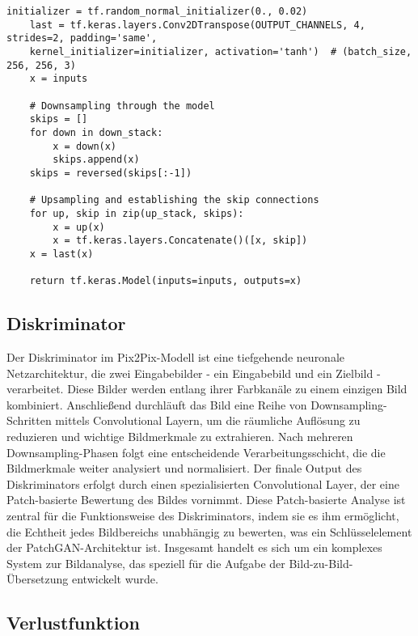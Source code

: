 \begin{lstlisting}[language=pyhaff, caption={Skip Verbindungen in Pix2Pix}, label={cod:Pix2PixGAN Generator}]
	initializer = tf.random_normal_initializer(0., 0.02)
	last = tf.keras.layers.Conv2DTranspose(OUTPUT_CHANNELS, 4, strides=2, padding='same',
	kernel_initializer=initializer, activation='tanh')  # (batch_size, 256, 256, 3)
	x = inputs
	
	# Downsampling through the model
	skips = []
	for down in down_stack:
		x = down(x)
		skips.append(x)
	skips = reversed(skips[:-1])
	
	# Upsampling and establishing the skip connections
	for up, skip in zip(up_stack, skips):
		x = up(x)
		x = tf.keras.layers.Concatenate()([x, skip])
	x = last(x)
	
	return tf.keras.Model(inputs=inputs, outputs=x)
\end{lstlisting}

\subsection{Diskriminator}
Der Diskriminator im Pix2Pix-Modell ist eine tiefgehende neuronale Netzarchitektur, die zwei Eingabebilder - ein Eingabebild und ein Zielbild - verarbeitet. Diese Bilder werden entlang ihrer Farbkanäle zu einem einzigen Bild kombiniert. Anschließend durchläuft das Bild eine Reihe von Downsampling-Schritten mittels Convolutional Layern, um die räumliche Auflösung zu reduzieren und wichtige Bildmerkmale zu extrahieren. Nach mehreren Downsampling-Phasen folgt eine entscheidende Verarbeitungsschicht, die die Bildmerkmale weiter analysiert und normalisiert. Der finale Output des Diskriminators erfolgt durch einen spezialisierten Convolutional Layer, der eine Patch-basierte Bewertung des Bildes vornimmt. Diese Patch-basierte Analyse ist zentral für die Funktionsweise des Diskriminators, indem sie es ihm ermöglicht, die Echtheit jedes Bildbereichs unabhängig zu bewerten, was ein Schlüsselelement der PatchGAN-Architektur ist. Insgesamt handelt es sich um ein komplexes System zur Bildanalyse, das speziell für die Aufgabe der Bild-zu-Bild-Übersetzung entwickelt wurde.




\subsection{Verlustfunktion}
